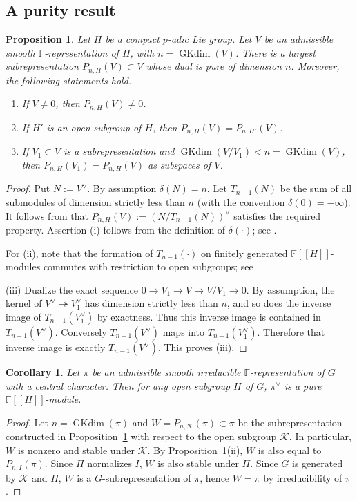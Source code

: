 \documentclass[11pt]{article}
\numberwithin{equation}{section}
\newtheorem{proposition}[theorem]{Proposition}
\newtheorem{corollary}[theorem]{Corollary}
\theoremstyle{definition}
\theoremstyle{remark}
\newcommand{\F}{\mathbb F}
\DeclareMathOperator{\GKdim}{GKdim}
\begin{document}
\begin{cbunit}
\subsection{A purity result}
 
\begin{proposition}\label{app:prop-purity}
Let $H$ be a compact $p$-adic Lie group. Let $V$ be an admissible smooth $\F$-representation of 
$H$, with $n=\GKdim(V)$. There is a largest subrepresentation
$P_{n,H}(V)\subset V$ whose dual is pure of dimension $n$. Moreover, the following statements hold.
\begin{enumerate}
\item[(i)] If $V\neq0$, then $P_{n,H}(V)\neq0$. 
\item[(ii)] If $H'$ is an open subgroup of $H$, then $P_{n,H}(V)=P_{n,H'}(V)$.
\item[(iii)] If $V_1\subset V$ is a subrepresentation and
$\GKdim(V/V_1)<n=\GKdim(V)$, then $P_{n,H}(V_1)=P_{n,H}(V)$  as subspaces of  $V$.
\end{enumerate}
\end{proposition}
\begin{proof}
Put $N:=V^\vee$. By assumption $\delta(N)=n$. Let $T_{n-1}(N)$ be the sum of all submodules of dimension
strictly less than $n$ (with the convention $\delta(0)=-\infty$). It follows from \cite[Prop.~3.5(vi)]{Ven02} that $P_{n,H}(V):=(N/T_{n-1}(N))^{\vee}$ satisfies the required property. Assertion (i) follows from the definition of $\delta(\cdot)$; see \cite[Prop.~3.5(ii)]{Ven02}. 

For (ii), note that the formation of $T_{n-1}(\cdot)$ on finitely generated $\F[[H]]$-modules commutes with restriction to open subgroups; see \cite[Prop.~2.7(ii)]{Ven02}. 
 
(iii) Dualize the exact sequence $0\rightarrow  V_1\rightarrow V\rightarrow V/V_1\rightarrow 0$. 
By assumption, the kernel of $V^\vee\twoheadrightarrow V_1^\vee$ has dimension
strictly less than $n$, and so does the inverse image of $T_{n-1}(V_1^\vee)$  by exactness. 
Thus this inverse image is contained in $T_{n-1}(V^{\vee})$. Conversely $T_{n-1}(V^{\vee})$
  maps into $T_{n-1}(V_1^\vee)$. Therefore that inverse image is  exactly $T_{n-1}(V^\vee)$.
This proves (iii).
\end{proof} \smallskip

\begin{corollary}\label{cor:pure}
Let $\pi$ be an admissible smooth irreducible $\F$-representation of $G$ with a central character. Then for any open subgroup $H$ of $G$, $\pi^{\vee}$ is a pure $\F[[H]]$-module.
\end{corollary}
\begin{proof}
Let $n=\GKdim(\pi)$ and $W=P_{n,\mathcal K}(\pi)\subset \pi$ be the subrepresentation constructed in Proposition~\ref{app:prop-purity} with respect to the open subgroup $\mathcal K$. In particular, $W$ is nonzero and stable under $\mathcal K$. By Proposition~\ref{app:prop-purity}(ii), $W$ is also equal to $P_{n,I}(\pi)$. Since $\Pi$ normalizes $I$, $W$ is also stable under $\Pi$. Since $G$ is generated by $\mathcal K$ and $\Pi$, $W$ is a $G$-subrepresentation of $\pi$, hence $W=\pi$ by irreducibility of $\pi$. 


\end{proof}
\end{cbunit}
\end{document}
